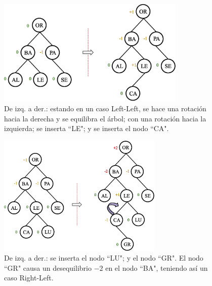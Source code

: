 \begin{figure}[htpb!]
  \begin{center}
    \includegraphics[width=0.8\textwidth]{images/AVLInsertion4.eps}
  \end{center}
  \caption{De izq. a der.: estando en un caso Left-Left, se hace una rotación hacia la derecha y se equilibra el árbol; con una rotación hacia la izquierda; se inserta ``LE"; y se inserta el nodo ``CA".}
  \label{fig:AVLInsertion4}
\end{figure}


\begin{figure}[htpb!]
  \begin{center}
    \includegraphics[width=0.7\textwidth]{images/AVLInsertion5.eps}
  \end{center}
  \caption{De izq. a der.: se inserta el nodo ``LU"; y el nodo ``GR". El nodo ``GR" causa un desequilibrio $-2$ en el nodo ``BA", teniendo así un caso Right-Left.}
  \label{fig:AVLInsertion5}
\end{figure}


